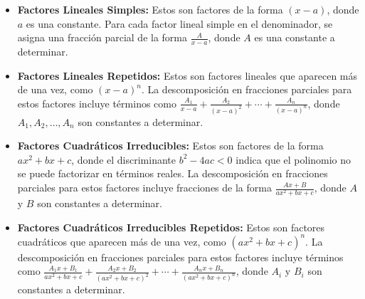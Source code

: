 \begin{itemize}
    \item \textbf{Factores Lineales Simples:} Estos son factores de la forma \( (x - a) \), donde \( a \) es una constante. Para cada factor lineal simple en el denominador, se asigna una fracción parcial de la forma \( \frac{A}{x - a} \), donde \( A \) es una constante a determinar.
    \item \textbf{Factores Lineales Repetidos:} Estos son factores lineales que aparecen más de una vez, como \( (x - a)^n \). La descomposición en fracciones parciales para estos factores incluye términos como \( \frac{A_1}{x - a} + \frac{A_2}{(x - a)^2} + \cdots + \frac{A_n}{(x - a)^n} \), donde \( A_1, A_2, \ldots, A_n \) son constantes a determinar.
    \item \textbf{Factores Cuadráticos Irreducibles:} Estos son factores de la forma \( ax^2 + bx + c \), donde el discriminante \( b^2 - 4ac < 0 \) indica que el polinomio no se puede factorizar en términos reales. La descomposición en fracciones parciales para estos factores incluye fracciones de la forma \( \frac{Ax + B}{ax^2 + bx + c} \), donde \( A \) y \( B \) son constantes a determinar.
    \item \textbf{Factores Cuadráticos Irreducibles Repetidos:} Estos son factores cuadráticos que aparecen más de una vez, como \( (ax^2 + bx + c)^n \). La descomposición en fracciones parciales para estos factores incluye términos como \( \frac{A_1x + B_1}{ax^2 + bx + c} + \frac{A_2x + B_2}{(ax^2 + bx + c)^2} + \cdots + \frac{A_nx + B_n}{(ax^2 + bx + c)^n} \), donde \( A_i \) y \( B_i \) son constantes a determinar.
\end{itemize}


